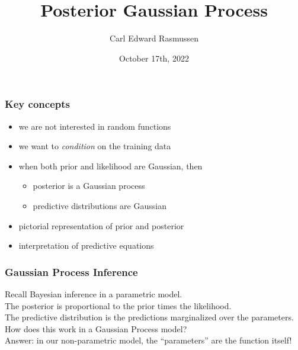 

\title{Posterior Gaussian Process}
\author{Carl Edward Rasmussen}
\date{October 17th, 2022}



\begin{frame}
\titlepage
\end{frame}

\begin{frame}
\frametitle{Key concepts}
\begin{itemize}
\item we are not interested in random functions
\item we want to \emph{condition} on the training data
\item when both prior and likelihood are Gaussian, then
\begin{itemize}
\item posterior is a Gaussian process
\item predictive distributions are Gaussian
\end{itemize}
\item pictorial representation of prior and posterior
\item interpretation of predictive equations
\end{itemize}
\end{frame}

\begin{frame}
\frametitle{Gaussian Process Inference}

Recall Bayesian inference in a parametric model.\\[1ex]

The posterior is proportional to the prior times the likelihood.\\[1ex]

The predictive distribution is the predictions marginalized over the
parameters.\\[1ex]

How does this work in a Gaussian Process model?\\[1ex]

Answer: in our non-parametric model, the ``parameters'' are the function itself!
\end{frame}


